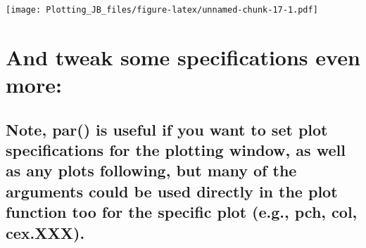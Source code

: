 \documentclass[]{article}
\newenvironment{Shaded}{\begin{snugshade}}{\end{snugshade}}
\newcommand{\DataTypeTok}[1]{\textcolor[rgb]{0.13,0.29,0.53}{#1}}
\newcommand{\KeywordTok}[1]{\textcolor[rgb]{0.13,0.29,0.53}{\textbf{#1}}}
\newcommand{\NormalTok}[1]{#1}
\newcommand{\OperatorTok}[1]{\textcolor[rgb]{0.81,0.36,0.00}{\textbf{#1}}}
\newcommand{\StringTok}[1]{\textcolor[rgb]{0.31,0.60,0.02}{#1}}
\begin{document}
\begin{Shaded}
\end{Shaded}

\texttt{[image: Plotting\_JB\_files/figure-latex/unnamed-chunk-17-1.pdf]}

\hypertarget{and-tweak-some-specifications-even-more}{%
\section{And tweak some specifications even
more:}\label{and-tweak-some-specifications-even-more}}

\hypertarget{note-par-is-useful-if-you-want-to-set-plot-specifications-for-the-plotting-window-as-well-as-any-plots-following-but-many-of-the-arguments-could-be-used-directly-in-the-plot-function-too-for-the-specific-plot-e.g.-pch-col-cex.xxx.}{%
\subsection{Note, par() is useful if you want to set plot specifications
for the plotting window, as well as any plots following, but many of the
arguments could be used directly in the plot function too for the
specific plot (e.g., pch, col,
cex.XXX).}\label{note-par-is-useful-if-you-want-to-set-plot-specifications-for-the-plotting-window-as-well-as-any-plots-following-but-many-of-the-arguments-could-be-used-directly-in-the-plot-function-too-for-the-specific-plot-e.g.-pch-col-cex.xxx.}}
\end{document}
